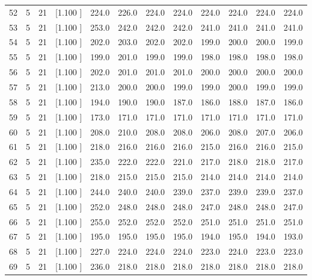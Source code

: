 \documentclass[12pt,a4paper]{article}
\begin{document}
\begin{center}
{\begin{tabular}{r r r r r r r r r r r r}
  52&  5& 21&[1.100     ]&   224.0&   226.0&   224.0&   224.0&   224.0&   224.0&   224.0&   224.0\\[-0.02in]
  53&  5& 21&[1.100     ]&   253.0&   242.0&   242.0&   242.0&   241.0&   241.0&   241.0&   241.0\\[-0.02in]
  54&  5& 21&[1.100     ]&   202.0&   203.0&   202.0&   202.0&   199.0&   200.0&   200.0&   199.0\\[-0.02in]
  55&  5& 21&[1.100     ]&   199.0&   201.0&   199.0&   199.0&   198.0&   198.0&   198.0&   198.0\\[-0.02in]
  56&  5& 21&[1.100     ]&   202.0&   201.0&   201.0&   201.0&   200.0&   200.0&   200.0&   200.0\\[-0.02in]
  57&  5& 21&[1.100     ]&   213.0&   200.0&   200.0&   199.0&   199.0&   200.0&   199.0&   199.0\\[-0.02in]
  58&  5& 21&[1.100     ]&   194.0&   190.0&   190.0&   187.0&   186.0&   188.0&   187.0&   186.0\\[-0.02in]
  59&  5& 21&[1.100     ]&   173.0&   171.0&   171.0&   171.0&   171.0&   171.0&   171.0&   171.0\\[-0.02in]
  60&  5& 21&[1.100     ]&   208.0&   210.0&   208.0&   208.0&   206.0&   208.0&   207.0&   206.0\\[-0.02in]
  61&  5& 21&[1.100     ]&   218.0&   216.0&   216.0&   216.0&   215.0&   216.0&   216.0&   215.0\\[-0.02in]
  62&  5& 21&[1.100     ]&   235.0&   222.0&   222.0&   221.0&   217.0&   218.0&   218.0&   217.0\\[-0.02in]
  63&  5& 21&[1.100     ]&   218.0&   215.0&   215.0&   215.0&   214.0&   214.0&   214.0&   214.0\\[-0.02in]
  64&  5& 21&[1.100     ]&   244.0&   240.0&   240.0&   239.0&   237.0&   239.0&   239.0&   237.0\\[-0.02in]
  65&  5& 21&[1.100     ]&   252.0&   248.0&   248.0&   248.0&   247.0&   248.0&   248.0&   247.0\\[-0.02in]
  66&  5& 21&[1.100     ]&   255.0&   252.0&   252.0&   252.0&   251.0&   251.0&   251.0&   251.0\\[-0.02in]
  67&  5& 21&[1.100     ]&   195.0&   195.0&   195.0&   195.0&   194.0&   195.0&   194.0&   193.0\\[-0.02in]
  68&  5& 21&[1.100     ]&   227.0&   224.0&   224.0&   224.0&   223.0&   224.0&   223.0&   223.0\\[-0.02in]
  69&  5& 21&[1.100     ]&   236.0&   218.0&   218.0&   218.0&   218.0&   218.0&   218.0&   218.0\\[-0.02in]

\end{tabular}}
\end{center}
\end{document}
